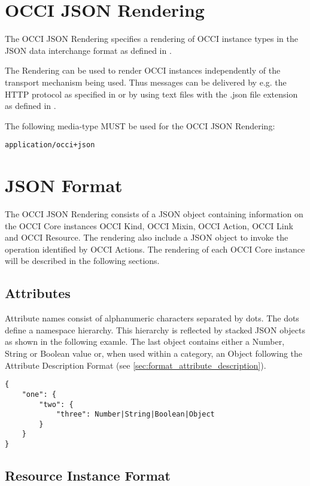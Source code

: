 \documentclass[10pt,a4paper]{article}
\begin{document}
\section{OCCI JSON Rendering}

The OCCI JSON Rendering specifies a rendering of OCCI instance types in the JSON
data interchange format as defined in \cite{rfc4627}.

The Rendering can be used to render OCCI instances independently of the
transport mechanism being used. Thus messages can be delivered by e.g. the HTTP
protocol as specified in \cite{occi:http_rendering} or by using text files with
the .json file extension as defined in \cite{rfc4627}.

The following media-type MUST be used for the OCCI JSON Rendering:

{\tt application/occi+json}

\section{JSON Format}
\label{sec:json_format}
The OCCI JSON Rendering consists of a JSON object containing information on the 
OCCI Core instances OCCI Kind, OCCI Mixin, OCCI Action,
OCCI Link and OCCI Resource. The rendering also include a JSON object to invoke
the operation identified by OCCI Actions.
The rendering of each OCCI Core instance will be
described in the following sections. 

\subsection{Attributes}

Attribute names consist of alphanumeric characters separated by dots. The dots
define a namespace hierarchy. This hierarchy is reflected by stacked JSON
objects as shown in the following examle. The last object contains either a
Number, String or Boolean value or, when used within a category, an Object
following the Attribute Description Format (see
\ref{sec:format_attribute_description}).
\begin{lstlisting}
{
    "one": {
        "two": {
            "three": Number|String|Boolean|Object
        }
    }
}
\end{lstlisting}

\subsection{Resource Instance Format}
\label{sec:format_resource}
\end{document}
